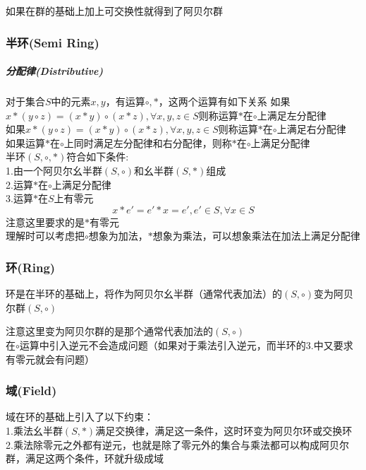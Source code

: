 \documentclass{article}
\begin{document}
\begin{CJK}{UTF8}{gkai}
如果在群的基础上加上可交换性就得到了阿贝尔群\\
\subsubsection*{半环(Semi Ring)}
\subparagraph{分配律(Distributive)\\}
对于集合$S$中的元素$x,y$，有运算$\circ , \ast$，这两个运算有如下关系
如果$x\ast(y \circ z) = (x \ast y)\circ(x \ast z),\forall x,y,z\in S$则称运算$\ast$在$\circ$上满足左分配律\\

如果$x\ast(y \circ z) = (x \ast y)\circ(x \ast z),\forall x,y,z\in S$则称运算$\ast$在$\circ$上满足右分配律\\

如果运算$\ast$在$\circ$上同时满足左分配律和右分配律，则称$\ast$在$\circ$上满足分配律\\

半环$(S,\circ,\ast )$符合如下条件:\\
1.由一个阿贝尔幺半群$(S,\circ)$和幺半群$(S,\ast)$组成\\
2.运算$\ast$在$\circ$上满足分配律\\
3.运算$\ast$在$S$上有零元\\
\[x\ast e' = e'\ast x = e',e'\in S ,\forall x \in S\]
注意这里要求的是$\ast$有零元\\

理解时可以考虑把$\circ$想象为加法，$\ast$想象为乘法，可以想象乘法在加法上满足分配律\\
\subsubsection*{环(Ring)}
环是在半环的基础上，将作为阿贝尔幺半群（通常代表加法）的$(S,\circ)$变为阿贝尔群$(S,\circ)$

注意这里变为阿贝尔群的是那个通常代表加法的$(S,\circ)$\\
在$\circ$运算中引入逆元不会造成问题（如果对于乘法引入逆元，而半环的3.中又要求有零元就会有问题）\\
\subsubsection*{域(Field)}
域在环的基础上引入了以下约束：\\

1.乘法幺半群$(S,\ast)$满足交换律，满足这一条件，这时环变为阿贝尔环或交换环\\

2.乘法除零元之外都有逆元，也就是除了零元外的集合与乘法都可以构成阿贝尔群，满足这两个条件，环就升级成域\\

\end{CJK}
\end{document}
